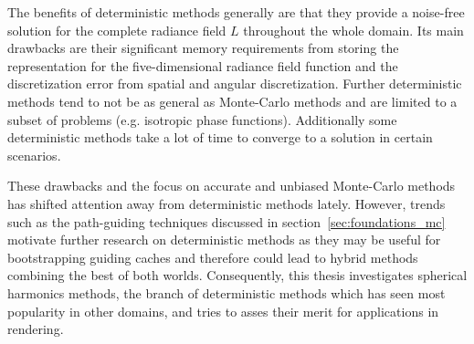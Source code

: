 The benefits of deterministic methods generally are that they provide a noise-free solution for the complete radiance field $L$ throughout the whole domain. Its main drawbacks are their significant memory requirements from storing the representation for the five-dimensional radiance field function and the discretization error from spatial and angular discretization. Further deterministic methods tend to not be as general as Monte-Carlo methods and are limited to a subset of problems (e.g. isotropic phase functions). Additionally some deterministic methods take a lot of time to converge to a solution in certain scenarios.

These drawbacks and the focus on accurate and unbiased Monte-Carlo methods has shifted attention away from deterministic methods lately. However, trends such as the path-guiding techniques discussed in section~\ref{sec:foundations_mc} motivate further research on deterministic methods as they may be useful for bootstrapping guiding caches and therefore could lead to hybrid methods combining the best of both worlds. Consequently, this thesis investigates spherical harmonics methods, the branch of deterministic methods which has seen most popularity in other domains, and tries to asses their merit for applications in rendering.

